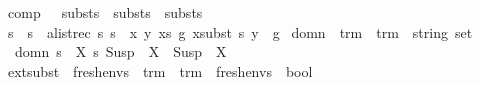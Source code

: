 \begin{isabellebody}
\isanewline
{}\isamarkupfalse%
\ comp\ {\isacharcolon}{\kern0pt}{\isacharcolon}{\kern0pt}\ \ {\isachardoublequoteopen}substs\ {\isasymRightarrow}\ substs\ {\isasymRightarrow}\ substs{\isachardoublequoteclose}\ {\isacharparenleft}{\kern0pt}\ {\isacartoucheopen}{\isasymbullet}{\isacartoucheclose}\ {}{}{\isacharparenright}{\kern0pt}\ \isanewline
\ {\isachardoublequoteopen}s{}\ {\isasymbullet}\ s{}\ {\isasymequiv}\ alist{\isacharunderscore}{\kern0pt}rec\ s{}\ s{}\ {\isacharparenleft}{\kern0pt}{\isasymlambda}\ x\ y\ xs\ g{\isachardot}{\kern0pt}\ {\isacharparenleft}{\kern0pt}x{\isacharcomma}{\kern0pt}subst\ s{}\ y{\isacharparenright}{\kern0pt}\ {\isacharhash}{\kern0pt}\ g{\isacharparenright}{\kern0pt}{\isachardoublequoteclose}\isanewline
\isanewline
\isanewline
\isanewline
{}\isamarkupfalse%
\ domn\ {\isacharcolon}{\kern0pt}{\isacharcolon}{\kern0pt}\ {\isachardoublequoteopen}{\isacharparenleft}{\kern0pt}trm\ {\isasymRightarrow}\ trm{\isacharparenright}{\kern0pt}\ {\isasymRightarrow}\ string\ set{\isachardoublequoteclose}\ \isanewline
\ \ {\isachardoublequoteopen}domn\ s\ {\isasymequiv}\ {\isacharbraceleft}{\kern0pt}X{\isachardot}{\kern0pt}\ {\isacharparenleft}{\kern0pt}s\ {\isacharparenleft}{\kern0pt}Susp\ {\isacharbrackleft}{\kern0pt}{\isacharbrackright}{\kern0pt}\ X{\isacharparenright}{\kern0pt}{\isacharparenright}{\kern0pt}\ {\isasymnoteq}\ {\isacharparenleft}{\kern0pt}Susp\ {\isacharbrackleft}{\kern0pt}{\isacharbrackright}{\kern0pt}\ X{\isacharparenright}{\kern0pt}{\isacharbraceright}{\kern0pt}{\isachardoublequoteclose}\ \isanewline
\isanewline
\isanewline
\isanewline
{}\isamarkupfalse%
\ ext{\isacharunderscore}{\kern0pt}subst\ {\isacharcolon}{\kern0pt}{\isacharcolon}{\kern0pt}\ {\isachardoublequoteopen}fresh{\isacharunderscore}{\kern0pt}envs\ {\isasymRightarrow}\ {\isacharparenleft}{\kern0pt}trm\ {\isasymRightarrow}\ trm{\isacharparenright}{\kern0pt}\ {\isasymRightarrow}\ fresh{\isacharunderscore}{\kern0pt}envs\ {\isasymRightarrow}\ bool{\isachardoublequoteclose}\ {\isacharparenleft}{\kern0pt}{\isachardoublequoteopen}\ {\isacharunderscore}{\kern0pt}\ {\isasymTurnstile}\ {\isacharunderscore}{\kern0pt}\ {\isacharunderscore}{\kern0pt}\ {\isachardoublequoteclose}\ {\isacharbrackleft}{\kern0pt}{}{}{\isacharcomma}{\kern0pt}{}{}{\isacharcomma}{\kern0pt}{}{}{\isacharbrackright}{\kern0pt}\ {}{}{\isacharparenright}{\kern0pt}\ \isanewline

\end{isabellebody}
